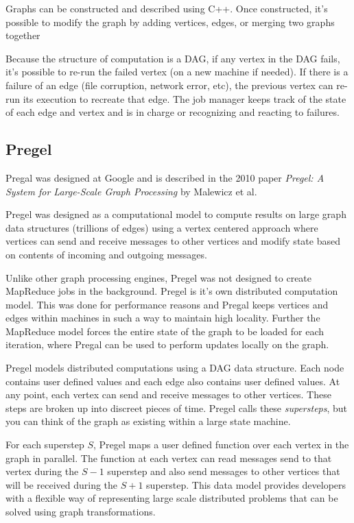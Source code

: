 \documentclass[]{article}
\begin{document}
Graphs can be constructed and described using C++. Once constructed, it's possible to modify the graph by adding vertices, edges, or merging two graphs together

Because the structure of computation is a DAG, if any vertex in the DAG fails, it's possible to re-run the failed vertex (on a new machine if needed). If there is a failure of an edge (file corruption, network error, etc), the previous vertex can re-run its execution to recreate that edge. The job manager keeps track of the state of each edge and vertex and is in charge or recognizing and reacting to failures.


\subsection{Pregel}
Pregal was designed at Google and is described in the 2010 paper \textit{Pregel: A System for Large-Scale Graph Processing}\cite{malewicz_pregel:_2010} by Malewicz et al. 

Pregel was designed as a computational model to compute results on large graph data structures (trillions of edges) using a vertex centered approach where vertices can send and receive messages to other vertices and modify state based on contents of incoming and outgoing messages. 

Unlike other graph processing engines, Pregel was not designed to create MapReduce jobs in the background. Pregel is it's own distributed computation model. This was done for performance reasons and Pregal keeps vertices and edges within machines in such a way to maintain high locality. Further the MapReduce model forces the entire state of the graph to be loaded for each iteration, where Pregal can be used to perform updates locally on the graph.

Pregel models distributed computations using a DAG data structure. Each node contains user defined values and each edge also contains user defined values. At any point, each vertex can send and receive messages to other vertices. These steps are broken up into discreet pieces of time. Pregel calls these \textit{supersteps}, but you can think of the graph as existing within a large state machine.

For each superstep $S$, Pregel maps a user defined function over each vertex in the graph in parallel. The function at each vertex can read messages send to that vertex during the $S-1$ superstep and also send messages to other vertices that will be received during the $S+1$ superstep. This data model provides developers with a flexible way of representing large scale distributed problems that can be solved using graph transformations. 
\end{document}
